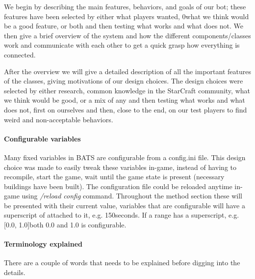 
We begin by describing the main features, behaviors, and goals of our bot; these features have been selected by either what players wanted, 0what we think would be a good feature, or both and then testing what works and what does not. We then give a brief overview of the system and how the different components/classes work and communicate with each other to get a quick grasp how everything is connected.

After the overview we will give a detailed description of all the important features of the classes, giving motivations of our design choices. The design choices were selected by either research, common knowledge in the StarCraft community, what we think would be good, or a mix of any and then testing what works and what does not, first on ourselves and then, close to the end, on our test players to find weird and non-acceptable behaviors.

\paragraph{Configurable variables}
Many fixed variables in BATS are configurable from a config.ini file. This design choice was made to easily tweak these variables in-game, instead of having to recompile, start the game, wait until the game state is present (necessary buildings have been built). The configuration file could be reloaded anytime in-game using \emph{/reload config} command. Throughout the method section these will be presented with their current value, variables that are configurable will have a superscript of \conf attached to it, e.g. 150\conf seconds. If a range has a superscript, e.g. [0.0, 1.0]\conf both 0.0 and 1.0 is configurable.

\paragraph{Terminology explained}
There are a couple of words that needs to be explained before digging into the details.

